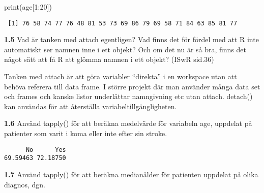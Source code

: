 \documentclass[
  letterpaper,
  DIV=11,
  numbers=noendperiod]{scrartcl}
\newenvironment{Shaded}{\begin{snugshade}}{\end{snugshade}}
\newcommand{\AttributeTok}[1]{\textcolor[rgb]{0.40,0.45,0.13}{#1}}
\newcommand{\ConstantTok}[1]{\textcolor[rgb]{0.56,0.35,0.01}{#1}}
\newcommand{\DecValTok}[1]{\textcolor[rgb]{0.68,0.00,0.00}{#1}}
\newcommand{\FunctionTok}[1]{\textcolor[rgb]{0.28,0.35,0.67}{#1}}
\newcommand{\NormalTok}[1]{\textcolor[rgb]{0.00,0.23,0.31}{#1}}
\newcommand{\SpecialCharTok}[1]{\textcolor[rgb]{0.37,0.37,0.37}{#1}}
\begin{document}
\begin{Shaded}
\begin{Highlighting}[]
\FunctionTok{print}\NormalTok{(age[}\DecValTok{1}\SpecialCharTok{:}\DecValTok{20}\NormalTok{])}
\end{Highlighting}
\end{Shaded}

\begin{verbatim}
 [1] 76 58 74 77 76 48 81 53 73 69 86 79 69 58 71 84 63 85 81 77
\end{verbatim}

\textbf{1.5} Vad är tanken med attach egentligen? Vad finns det för
fördel med att R inte automatiskt ser namnen inne i ett objekt? Och om
det nu är så bra, finns det något sätt att få R att glömma namnen i ett
objekt? (ISwR sid.36)

Tanken med attach är att göra variabler ``direkta'' i en workspace utan
att behöva referera till data frame. I större projekt där man använder
många data set och frames och kanske listor underlättar namngivning etc
utan attach. detach() kan användas för att återställa
variabeltillgängligheten.

\textbf{1.6} Använd tapply() för att beräkna medelvärde för variabeln
age, uppdelat på patienter som varit i koma eller inte efter sin stroke.

\begin{Shaded}
\end{Shaded}

\begin{verbatim}
      No      Yes 
69.59463 72.18750 
\end{verbatim}

\textbf{1.7} Använd tapply() för att beräkna medianålder för patienten
uppdelat på olika diagnos, dgn.

\begin{Shaded}
\end{Shaded}
\end{document}

